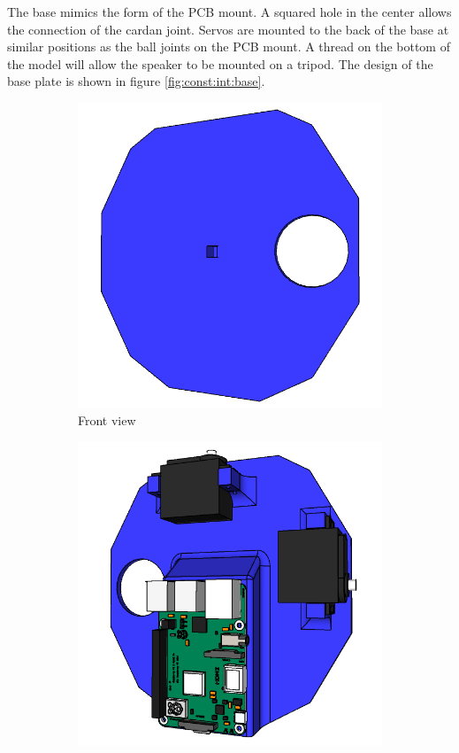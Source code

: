 The base mimics the form of the PCB mount. A squared hole in the center allows the connection of the cardan joint. Servos are mounted to the back of the base at similar positions as the ball joints on the PCB mount. A thread on the bottom of the model will allow the speaker to be mounted on a tripod. The design of the base plate is shown in figure \ref{fig:const:int:base}.
%
\begin{figure}[ht]
  \begin{subfigure}[b]{0.48\textwidth}
    \includegraphics[width=\textwidth]{src/assets/pictures/construction/base_plate_front.png}
    \caption{Front view}
    \label{fig:const:int:base_front}
  \end{subfigure}
  \hfill
  \begin{subfigure}[b]{0.49\textwidth}
    \includegraphics[width=\textwidth]{src/assets/pictures/construction/base_plate_back.png}

\end{subfigure}
\end{figure}
